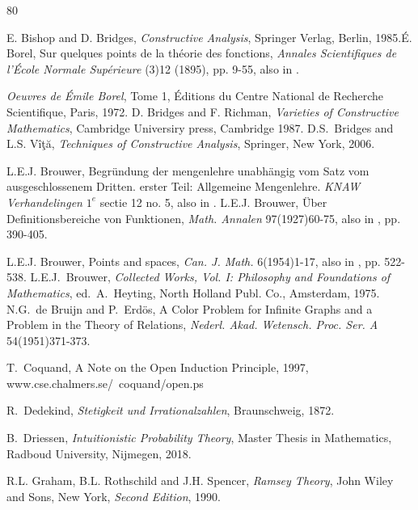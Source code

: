 \documentclass[a4paper]{amsart}
\theoremstyle{plain}
\begin{document}
\begin{thebibliography}{80}
 
 
  E. Bishop and D. Bridges, \textit{Constructive Analysis}, Springer Verlag, Berlin, 1985.\'E. Borel, Sur quelques points de la th\'eorie des fonctions, {\it Annales Scientifiques de l'\'Ecole Normale Sup\'erieure} (3)12 (1895),  pp. 9-55, also in \cite[pp. 239-287]{borelcw}.

 \textit{Oeuvres de \'Emile Borel}, Tome 1, \'Editions du Centre National de Recherche Scientifique, Paris, 1972.  D. Bridges and F. Richman, \textit{Varieties of Constructive Mathematics}, Cambridge Universiry press, Cambridge 1987.
 D.S.~Bridges and L.S.  V\^i\c{t}\u{a}, {\it Techniques of Constructive Analysis}, Springer, New York, 2006.

 L.E.J. Brouwer, Begr\"undung der mengenlehre unabh\"angig vom Satz vom ausgeschlossenem Dritten. erster Teil: Allgemeine Mengenlehre. {\it KNAW Verhandelingen} $1^e$ sectie 12 no. 5, also in \cite[150-190]{brouwer75}.
 L.E.J. Brouwer, \"Uber Definitionsbereiche von Funktionen, \textit{Math. Annalen} 97(1927)60-75, also in \cite{brouwer75}, pp. 390-405.



 L.E.J. Brouwer, Points and spaces, \textit{Can. J. Math.} 6(1954)1-17, also in \cite{brouwer75}, pp. 522-538.
 L.E.J.~Brouwer, \textit{Collected Works, Vol. I: Philosophy and
 Foundations of Mathematics}, ed.~A.~Heyting, North Holland Publ. Co., Amsterdam,
 1975.  N.G.~de Bruijn and P.~Erd\"os, A Color Problem for Infinite Graphs and a Problem in the Theory of Relations,  \textit{Nederl. Akad. Wetensch. Proc. Ser. A} 54(1951)371-373. 
 



T.~Coquand, A Note on the Open Induction Principle, 1997, www.cse.chalmers.se/~coquand/open.ps
 
 R.~Dedekind, \textit{Stetigkeit und Irrationalzahlen}, Braunschweig, 1872.


 B.~Driessen, {\it Intuitionistic Probability Theory}, Master Thesis in Mathematics, Radboud University, Nijmegen, 2018.
 
 
  R.L. Graham, B.L. Rothschild and  J.H. Spencer, \textit{Ramsey Theory}, John Wiley and Sons, New York, { \it Second  Edition}, 1990.
 

\end{thebibliography}
\end{document}
